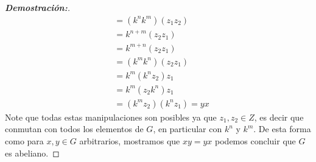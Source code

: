 \documentclass[12pt]{article}
\begin{document}
\begin{enumerate}
\begin{proof}[\textbf{Demostración:}]
\begin{align*}
          &=(k^nk^m)(z_1z_2)\\
          &=k^{n+m}(z_2z_1)\\
          &=k^{m+n}(z_2z_1)\\
          &=(k^mk^n)(z_2z_1)\\
          &=k^m(k^nz_2)z_1\\
          &=k^m(z_2k^n)z_1\\
          &=(k^mz_2)(k^nz_1)=yx
    \end{align*}
    Note que todas estas manipulaciones son posibles ya que $z_1,z_2\in Z$, es decir que conmutan con todos los elementos de $G$, en particular con $k^n$ y $k^m$. De esta forma como para $x,y\in G$ arbitrarios, mostramos que $xy=yx$ podemos concluir que $G$ es abeliano.
        
    \end{proof}
\end{enumerate}
\end{document}
